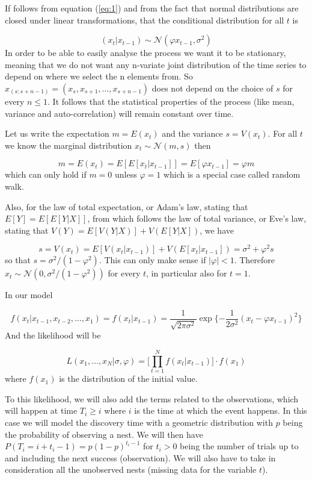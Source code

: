 \documentclass[11pt,a4paper]{article}
\begin{document}
If follows from equation (\ref{eq:1}) and from the fact that normal distributions are closed under linear transformations, that the conditional distribution for all $t$ is

\[
(x_{t} | x_{t-1}) \sim \mathcal{N} (\varphi x_{t-1}, \sigma^{2})
\]
In order to be able to easily analyse the process we want it to be stationary, meaning that we do not want any n-variate joint distribution of the time series to depend on where we select the n elements from. So $x_{(s:s+n-1)}= (x_s, x_{s+1},  \dots, x_{s+n-1})$ does not depend on the choice of $s$ for every $n \leq 1$.
It follows that the statistical properties of the process (like mean, variance and auto-correlation) will remain constant over time.

Let us write the expectation $m = E(x_t)$ and the variance $s = V(x_t)$. For all $t$ we know the marginal distribution $x_t \sim \mathcal{N}(m,s)$ then

\[
m = E(x_t) = E[E[x_t | x_{t-1}]] = E[\varphi x_{t-1}] = \varphi m
\]
which can only hold if $m = 0$ unless $\varphi = 1$ which is a special case called random walk.

Also, for the law of total expectation, or Adam's law, stating that $E[Y] = E[E[Y | X]]$, from which follows the law of total variance, or Eve's law, stating that $V(Y) = E[V(Y | X)] + V(E[Y | X])$, we have

\[
s = V(x_t) = E[V(x_t | x_{t-1})] + V(E[x_t | x_{t-1}]) = \sigma^2 + \varphi^2 s
\]
so that $s = \sigma^2 / ( 1 - \varphi^2 ) $. This can only make sense if $| \varphi | < 1$. Therefore $x_t \sim \mathcal{N}(0, \sigma^2 / ( 1 - \varphi^2 ) )$ for every $t$, in particular also for $t = 1$.

In our model

\[
f(x_{t} | x_{t-1} , x_{t-2}, \dots , x_{1}) = f(x_{t} | x_{t-1}) =  \frac{1}{\sqrt{2 \pi \sigma^{2}}} \exp \Bigg \{ { - \frac{1}{2 \sigma^{2}} }  (x_{t} - \varphi x_{t-1})^{2} \Bigg \}
\]
And the likelihood will be

\[
L(x_{1}, \dots , x_{N} | \sigma, \varphi) = \Bigg [ \prod_{t=1}^{N} f(x_{t} | x_{t-1}) \Bigg] \cdot f(x_{1})
\]
where $f(x_{1})$ is the distribution of the initial value.

To this likelihood, we will also add the terms related to the observations, which will happen at time $T_{i} \geq i$ where $i$ is the time at which the event happens. In this case we will model the discovery time with a geometric distribution with $p$ being the probability of observing a nest.  We will then have $P(T_{i} = i + t_i - 1) = p(1 - p)^{t_i - 1}$ for $t_i > 0$ being the number of trials up to and including the next success (observation). We will also have to take in consideration all the unobserved nests (missing data for the variable $t$).
\end{document}
